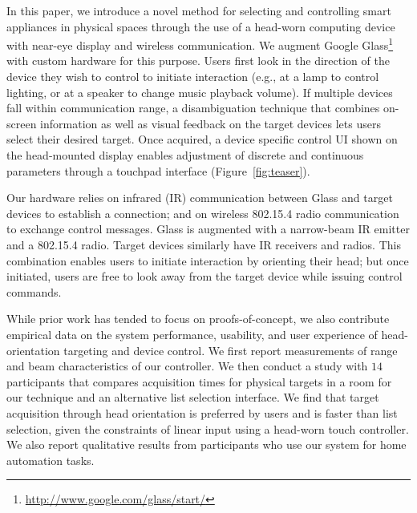 In this paper, we introduce a novel method for selecting and controlling smart appliances in physical spaces through the use of a head-worn computing device with near-eye display and wireless communication. We augment Google Glass\footnote{\url{http://www.google.com/glass/start/}} with custom hardware for this purpose. Users first look in the direction of the device they wish to control to initiate interaction (e.g., at a lamp to control lighting, or at a speaker to change music playback volume).  If multiple devices fall within communication range, a disambiguation technique that combines on-screen information as well as visual feedback on the target devices lets users select their desired target. Once acquired, a device specific control UI shown on the head-mounted display enables adjustment of discrete and continuous parameters through a touchpad interface (Figure~\ref{fig:teaser}).

Our hardware relies on infrared (IR) communication between Glass and target devices to establish a connection; and on wireless 802.15.4 radio communication to exchange control messages.  Glass is augmented with a narrow-beam IR emitter and a 802.15.4 radio. Target devices similarly have IR receivers and radios. This combination enables users to initiate interaction by orienting their head; but once initiated, users are free to look away from the target device while issuing control commands.

While prior work has tended to focus on proofs-of-concept, we also contribute empirical data on the system performance, usability, and user experience of  head-orientation targeting and device control. We first report measurements of range and beam characteristics of our controller. We then conduct a study with $14$ participants that compares acquisition times for physical targets in a room for our technique and an alternative list selection interface. We find that target acquisition through head orientation is preferred by users and is faster than list selection, given the constraints of linear input using a head-worn touch controller. We also report qualitative results from participants who use our system for home automation tasks.






